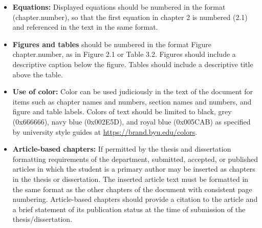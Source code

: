 \begin{itemize}
\item {\bfseries Equations:} Displayed equations should be numbered in the format (chapter.number), so that the first equation in chapter 2 is numbered (2.1) and referenced in the text in the same format. 

\item {\bfseries Figures and tables} should be numbered in the format Figure chapter.number, as in Figure 2.1 or Table 3.2. Figures should include a descriptive caption below the figure. Tables should include a descriptive title above the table. 

\item {\bfseries Use of color:} Color can be used judiciously in the text of the document for items such as chapter names and numbers, section names and numbers, and figure and table labels. Colors of text should be limited to black, grey (0x666666), navy blue (0x002E5D), and royal blue (0x005CAB) as specified by university style guides at \url{https://brand.byu.edu/colors}.

\item {\bfseries Article-based chapters:} If permitted by the thesis and dissertation formatting requirements of the department, submitted, accepted, or published articles in which the student is a primary author may be inserted as chapters in the thesis or dissertation. The inserted article text must be formatted in the same format as the other chapters of the document with consistent page numbering. Article-based chapters should provide a citation to the article and a brief statement of its publication status at the time of submission of the thesis/dissertation.
\end{itemize}